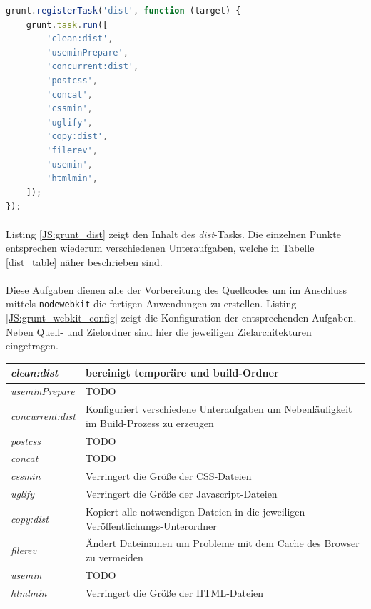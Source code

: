 \newpage
\begin{lstlisting}[language=JavaScript,label=JS:grunt_dist,caption=grunt dist-Task]
grunt.registerTask('dist', function (target) {
	grunt.task.run([
		'clean:dist',
		'useminPrepare',
		'concurrent:dist',
		'postcss',
		'concat',
		'cssmin',
		'uglify',
		'copy:dist',
		'filerev',
		'usemin',
		'htmlmin',
	]);
});
\end{lstlisting}

\paragraph{}Listing \ref{JS:grunt_dist} zeigt den Inhalt des \textit{dist}-Tasks. Die einzelnen Punkte entsprechen wiederum verschiedenen Unteraufgaben, welche in Tabelle \ref{dist_table} näher beschrieben sind.

\paragraph{}Diese Aufgaben dienen alle der Vorbereitung des Quellcodes um im Anschluss mittels \texttt{nodewebkit} die fertigen Anwendungen zu erstellen. Listing \ref{JS:grunt_webkit_config} zeigt die Konfiguration der entsprechenden Aufgaben. Neben Quell- und Zielordner sind hier die jeweiligen Zielarchitekturen eingetragen.

\begin{tabularx}{0.92\textwidth}{lX}
	\textit{clean:dist} & bereinigt temporäre und build-Ordner\\ \hline
	\textit{useminPrepare} & TODO\\ \hline
	\textit{concurrent:dist} & Konfiguriert verschiedene Unteraufgaben um Nebenläufigkeit im Build-Prozess zu erzeugen\\ \hline
	\textit{postcss} & TODO\\ \hline
	\textit{concat} & TODO\\ \hline
	\textit{cssmin} & Verringert die Größe der CSS-Dateien\\ \hline
	\textit{uglify} & Verringert die Größe der Javascript-Dateien\\ \hline
	\textit{copy:dist} & Kopiert alle notwendigen Dateien in die jeweiligen Veröffentlichungs-Unterordner\\ \hline
	\textit{filerev} & Ändert Dateinamen um Probleme mit dem Cache des Browser zu vermeiden\\ \hline
	\textit{usemin} &  TODO\\ \hline
	\textit{htmlmin} & Verringert die Größe der HTML-Dateien\\ \hline
\end{tabularx}
\label{dist_table}
\vspace*{1cm}

